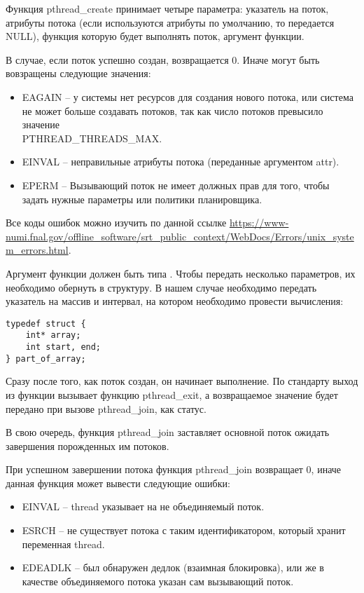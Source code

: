 Функция pthread\_create принимает четыре параметра: указатель на поток, атрибуты потока (если используются атрибуты по умолчанию, то передается NULL), функция которую будет выполнять поток, аргумент функции.

В случае, если поток успешно создан, возвращается 0. Иначе могут быть вовзращены следующие значения:

\begin{itemize}
    \item EAGAIN – у системы нет ресурсов для создания нового потока, или система не может больше создавать потоков, так как число потоков превысило значение \\ PTHREAD\_THREADS\_MAX\@.
    \item EINVAL – неправильные атрибуты потока (переданные аргументом attr).
    \item EPERM – Вызывающий поток не имеет должных прав для того, чтобы задать нужные параметры или политики планировщика.
\end{itemize}

Все коды ошибок можно изучить по данной ссылке \url{https://www-numi.fnal.gov/offline_software/srt_public_context/WebDocs/Errors/unix_system_errors.html}.

Аргумент функции должен быть типа . Чтобы передать несколько параметров, их необходимо обернуть в структуру. В нашем случае необходимо передать указатель на массив и интервал, на котором необходимо провести вычисления:

\begin{verbatim}
typedef struct {
    int* array;
    int start, end;
} part_of_array;
\end{verbatim}

Сразу после того, как поток создан, он начинает выполнение. По стандарту выход из функции вызывает функцию pthread\_exit, а возвращаемое значение будет передано при вызове pthread\_join, как статус.

В свою очередь, функция pthread\_join заставляет основной поток ожидать завершения порожденных им потоков.

При успешном завершении потока функция pthread\_join возвращает 0, иначе данная функция может вывести следующие ошибки:

\begin{itemize}
    \item EINVAL – thread указывает на не объединяемый поток.
    \item ESRCH – не существует потока с таким идентификатором, который хранит переменная thread.
    \item EDEADLK – был обнаружен дедлок (взаимная блокировка), или же в качестве объединяемого потока указан сам вызывающий поток.
\end{itemize}

